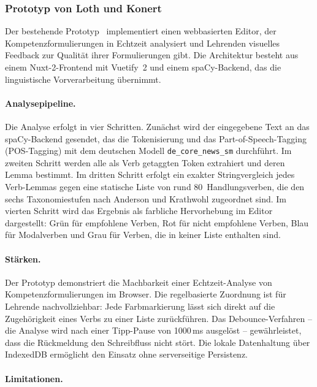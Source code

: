 \subsubsection{Prototyp von Loth und Konert}\label{sec:relwork-prototyp}

Der bestehende Prototyp~\cite{loth2022kompetenzeditor,loth2022masterprojekt} implementiert einen webbasierten Editor, der Kompetenzformulierungen in Echtzeit analysiert und Lehrenden visuelles Feedback zur Qualität ihrer Formulierungen gibt.
Die Architektur besteht aus einem Nuxt-2-Frontend mit Vuetify~2 und einem spaCy-Backend, das die linguistische Vorverarbeitung übernimmt.

\paragraph{Analysepipeline.}

Die Analyse erfolgt in vier Schritten.
Zunächst wird der eingegebene Text an das spaCy-Backend gesendet, das die Tokenisierung und das Part-of-Speech-Tagging (POS-Tagging) mit dem deutschen Modell \texttt{de\_core\_news\_sm} durchführt.
Im zweiten Schritt werden alle als Verb getaggten Token extrahiert und deren Lemma bestimmt.
Im dritten Schritt erfolgt ein exakter Stringvergleich jedes Verb-Lemmas gegen eine statische Liste von rund 80~Handlungsverben, die den sechs Taxonomiestufen nach Anderson und Krathwohl zugeordnet sind.
Im vierten Schritt wird das Ergebnis als farbliche Hervorhebung im Editor dargestellt: Grün für empfohlene Verben, Rot für nicht empfohlene Verben, Blau für Modalverben und Grau für Verben, die in keiner Liste enthalten sind.

\paragraph{Stärken.}

Der Prototyp demonstriert die Machbarkeit einer Echtzeit-Analyse von Kompetenzformulierungen im Browser.
Die regelbasierte Zuordnung ist für Lehrende nachvollziehbar: Jede Farbmarkierung lässt sich direkt auf die Zugehörigkeit eines Verbs zu einer Liste zurückführen.
Das Debounce-Verfahren -- die Analyse wird nach einer Tipp-Pause von 1000\,ms ausgelöst -- gewährleistet, dass die Rückmeldung den Schreibfluss nicht stört.
Die lokale Datenhaltung über IndexedDB ermöglicht den Einsatz ohne serverseitige Persistenz.

\paragraph{Limitationen.}

